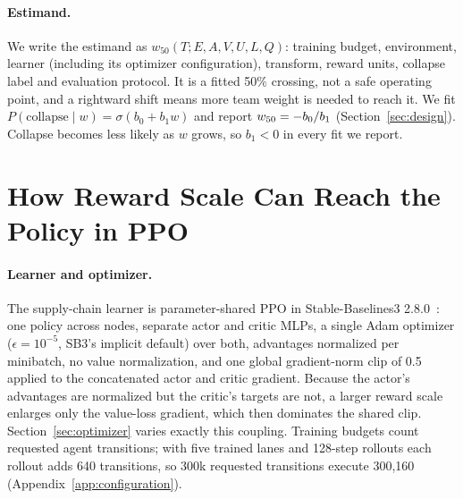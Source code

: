 \paragraph{Estimand.}
We write the estimand as $w_{50}(T;E,A,V,U,L,Q)$: training budget, environment, learner (including its
optimizer configuration), transform, reward units, collapse label and evaluation protocol. It is a
fitted 50\% crossing, not a safe operating point, and a rightward shift means more team weight is needed
to reach it. We fit $P(\mathrm{collapse}\mid w)=\sigma(b_0+b_1w)$ and report $w_{50}=-b_0/b_1$
(Section~\ref{sec:design}). Collapse becomes less likely as $w$ grows, so $b_1<0$ in every fit we report.


\section{How Reward Scale Can Reach the Policy in PPO}
\label{sec:mechanism}

\paragraph{Learner and optimizer.}
The supply-chain learner is parameter-shared PPO in Stable-Baselines3 2.8.0~\citep{raffin2021sb3}:
one policy across nodes, separate actor and critic MLPs, a single Adam optimizer ($\epsilon=10^{-5}$,
SB3's implicit default) over both, advantages normalized per minibatch, no value normalization, and one
global gradient-norm clip of 0.5 applied to the concatenated actor and critic gradient. Because the
actor's advantages are normalized but the critic's targets are not, a larger reward scale enlarges only
the value-loss gradient, which then dominates the shared clip. Section~\ref{sec:optimizer} varies
exactly this coupling. Training budgets count requested agent transitions; with five trained lanes and
128-step rollouts each rollout adds 640 transitions, so 300k requested transitions execute 300,160
(Appendix~\ref{app:configuration}).

